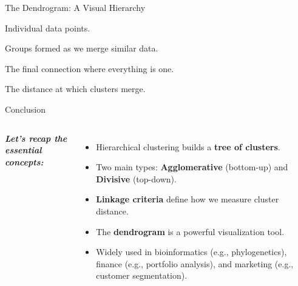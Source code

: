 \documentclass{beamer}
\begin{document}
\begin{frame}{The Dendrogram: A Visual Hierarchy}
\begin{tikzpicture}
    \end{tikzpicture}

    \vspace{0.4cm}
    \begin{description}
        \item<1->[\alert<1>{Leaves:}] Individual data points. 
        \item<2->[\alert<2-3>{Branches:}] Groups formed as we merge similar data.
        \item<4->[\alert<4>{Root:}] The final connection where everything is one.
        \item<5->[\alert<5>{Height:}] The distance at which clusters merge.
    \end{description}
\end{frame}


\begin{frame}{Conclusion}
    \begin{columns}
            {\large\bfseries\itshape\color{myblue} Let’s recap the essential concepts:}

            \vspace{0.3cm}
        
            \begin{itemize}
                \item<1-> Hierarchical clustering builds a \textbf{\textcolor{myorange}{tree of clusters}}.
                \item<2-> Two main types: \textbf{Agglomerative} (bottom-up) and \textbf{Divisive} (top-down).
                \item<3-> \textbf{Linkage criteria} define how we measure cluster distance.
                \item<4-> The \textbf{\textcolor{myorange}{dendrogram}} is a powerful visualization tool.
                \item<5-> Widely used in bioinformatics (e.g., phylogenetics), finance (e.g., portfolio analysis), and marketing (e.g., customer segmentation).
            \end{itemize}
            \centering
    \end{columns}
\end{frame}
\end{document}
